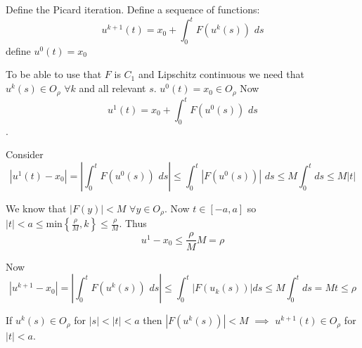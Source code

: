 Define the Picard iteration. Define a sequence of functions: $$u^{k+1}(t) = x_0 + \int_0^t F(u^k(s)) \, \, ds$$ define $u^0(t) = x_0$

To be able to use that $F$ is $C_1$ and Lipschitz continuous we need that $u^k(s) \in O_{\rho}$ $\forall k$ and all relevant $s$. $u^0(t) = x_0 \in O_{\rho}$ Now $$u^1(t) = x_0 + \int_0^t F(u^0(s)) \, \, ds$$.

Consider $$|u^1(t) - x_0| = |\int_0^t F(u^0(s)) \, \, ds| \leq \int_0^t |F(u^0(s))| \, \, ds \leq M \int_0^t ds \leq M|t|$$

We know that $|F(y)| < M$ $\forall y \in O_{\rho}$. Now $t\in[-a, a]$ so $|t| < a \leq \text{min} \left\{\frac{\rho}{M}, k\right\} \leq \frac{\rho}{M}$. Thus $$u^1 - x_0 \leq \frac{\rho}{M} M = \rho$$

Now $$|u^{k+1} - x_0| = |\int_0^t F(u^k(s)) \, \, ds| \leq \int_0^t |F(u_k(s))| ds \leq M \int_0^t ds = Mt \leq \rho$$

If $u^k(s) \in O_{\rho}$ for $|s| < |t| < a$ then $|F(u^k(s))| < M$ $\implies$ $u^{k+1} (t) \in O_{\rho}$ for $|t| < a$.